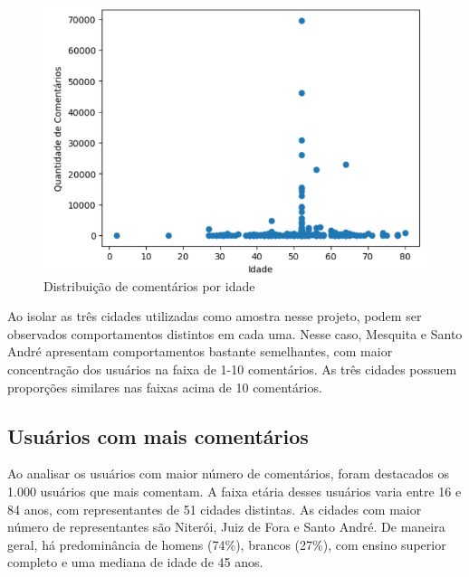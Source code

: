 \begin{figure}[!htb]
	\caption{Distribuição de comentários por idade}
	\label{fig:colab_comments_by_age}
	\centering
	\includegraphics[scale=0.8]{images/colab_comments_by_age.png}
\end{figure}

Ao isolar as três cidades utilizadas como amostra nesse projeto, podem ser observados comportamentos distintos em cada uma. Nesse caso, Mesquita e Santo André apresentam comportamentos bastante semelhantes, com maior concentração dos usuários na faixa de 1-10 comentários. As três cidades possuem proporções similares nas faixas acima de 10 comentários.

\subsection*{Usuários com mais comentários}

Ao analisar os usuários com maior número de comentários, foram destacados os 1.000 usuários que mais comentam. A faixa etária desses usuários varia entre 16 e 84 anos, com representantes de 51 cidades distintas. As cidades com maior número de representantes são Niterói, Juiz de Fora e Santo André. De maneira geral, há predominância de homens (74\%), brancos (27\%), com ensino superior completo e uma mediana de idade de 45 anos.

